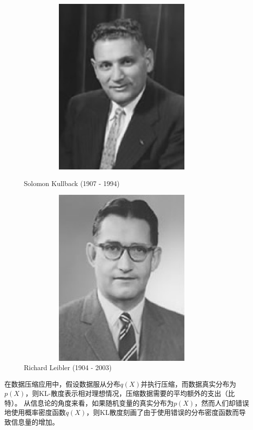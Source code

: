 \begin{figure}[htbp]
\begin{minipage}[h]{0.49\linewidth}
\centering
  \includegraphics[width=0.95\textwidth, height=9cm]{figures/scientists/SolomonKullback.eps}
  \caption{Solomon Kullback (1907 - 1994)}\label{fig:SolomonKullback}
\end{minipage}
\begin{minipage}[h]{0.49\linewidth}
\centering
  \includegraphics[width=0.95\textwidth, height=9cm]{figures/scientists/RichardLeibler.eps}
  \caption{Richard Leibler (1904 - 2003)}\label{fig:RichardLeibler}
\end{minipage}
\end{figure}

在数据压缩应用中，假设数据服从分布$q(X)$并执行压缩，而数据真实分布为$p(X)$，则KL-散度表示相对理想情况，压缩数据需要的平均额外的支出（比特）。
从信息论的角度来看，如果随机变量的真实分布为$p(X)$，然而人们却错误地使用概率密度函数$q(X)$，则KL散度刻画了由于使用错误的分布密度函数而导致信息量的增加。

